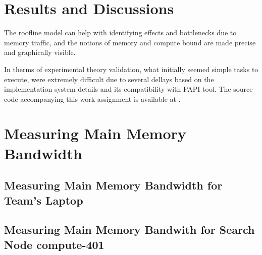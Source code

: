 \documentclass{sigplanconf}
\begin{document}
\section{Results and Discussions}

The  roofline  model   can  help  with
identifying  effects  and  bottlenecks  due  to  memory  traffic, and
the notions of memory and compute bound are made precise and graphically visible.\par 
In therms of experimental theory validation, what  initially seemed simple tasks to execute, were extremely difficult due to several dellays based on the implementation system details and its compatibility with PAPI tool.
The source code accompanying this work assignment is available
at \cite{source}.

\newpage
\newpage
\appendix

\section{Measuring Main Memory Bandwidth}
\label{appendix:stream}
\subsection{Measuring Main Memory Bandwidth for Team's Laptop}




\subsection{Measuring Main Memory Bandwith for Search Node compute-401}


\end{document}
